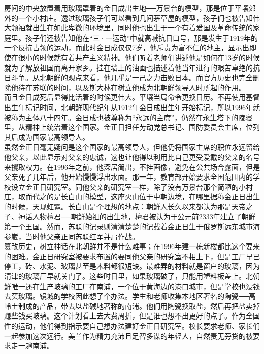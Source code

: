 房间的中央放置着用玻璃罩着的金日成出生地──万景台的模型，那是位于平壤郊外的一个小村庄。透过玻璃孩子们可以看到几间茅草屋的模型，孩子们也被告知伟大领袖就出生在如此卑微的环境里，同时他也出生于一个有着爱国及革命传统的家庭里。孩子们还被告知他在“三·一运动”中就高喊抗日口号，那是发生于1919年的一个反抗占领的运动，而此时金日成仅仅7岁，他斥责为富不仁的地主，显示出即使在很小的时候就有着共产主义精神。他们听着老师们讲述他是如何在13岁的时候就为了解放祖国而离开家乡。挂在墙上的油画也描述着他当年进行的艰苦卓绝的抗日斗争。从北朝鲜的观点来看，他几乎是一己之力击败日本。而官方历史也完全删除他待在苏联的时间，以及斯大林在树立他成为北朝鲜领导人时所起的作用。\\

而且金日成死后显得比活着的时候更伟大。平壤当局命令更换日历。不再使用基督出生年标记时间，北朝鲜现代纪年从1912年金日成出生年开始标记，所以1996年就被称为主体八十四年。金日成也被尊称为“永远的主席”，仍然在永生塔下的陵寝里，从精神上统治着这个国家。金正日担任劳动党总书记、国防委员会主席，位列其后成为国家最高领导人。\\

虽然金正日毫无疑问是这个国家的最高领导人，但他仍将国家主席的职位永远留给他父亲，以此显示对父亲的忠诚，这也让他得以利用比自己更受爱戴的父亲的名号来攫取权力。在1996年之前，他深居简出，不挂画像，避免在公共场合露面，但是父亲死了几年后，他开始慢慢浮出水面。那一年，教育部开始要求全国范围内的学校设立金正日研究室。同他父亲的研究室一样，除了没有万景台那个简陋的小村庄，取而代之的是长白山的模型，这座火山位于中朝边境，在哪里据称金正日出生的时候，天现虹霓。长白山是个理想的地点：朝鲜人长久以来都认为那是天帝之子、神话人物檀君──朝鲜始祖的出生地，檀君被认为于公元前2333年建立了朝鲜第一个王国。然而，苏联的记录则清清楚楚的记载着金正日生于俄罗斯远东城市海参崴，当时他父亲正同苏联红军并肩作战。\\

篡改历史，树立神话在北朝鲜并不是什么难事；在1996年建一栋新楼都比这个要来的困难。金正日研究室被要求布置的要同他父亲的研究室不相上下，但是工厂早已停工，砖、水泥、玻璃甚至是木料都很短缺。最难弄的材料就是窗户的玻璃，因为清津的玻璃厂早就关门了。这些时日里，如果玻璃破了，只能用塑料板盖上。北朝鲜唯一还在生产玻璃的工厂在南浦，一个位于黄海边的港口城市，但是学校也没钱去买玻璃。镜城的学校因此想了个办法。学生和老师收集本地区著名的陶瓷──高岭土制成的产品，带去以盐碱地著称的南浦。他们用陶瓷换取盐，然后再把盐卖掉赚些钱买玻璃。这个计划看上去大费周折，但是谁也想不出更好的点子。作为全国性的运动，他们得到指示要自己想办法建好金正日研究室。校长要求老师、家长们一起参加这次远行。美兰作为精力充沛且足智多谋的年轻人，自然责无旁贷的被要求走一趟南浦。\\

